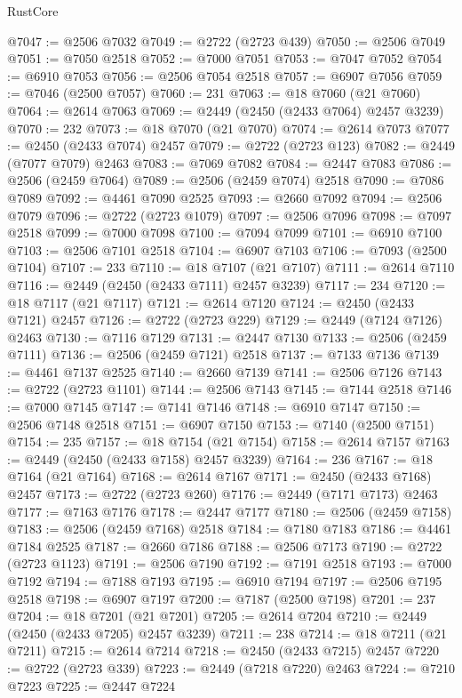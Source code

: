 \begin{lexlean}{RustCore}
\begin{coremodule}
@7047 := @2506 @7032
@7049 := @2722 (@2723 @439)
@7050 := @2506 @7049
@7051 := @7050 @2518
@7052 := @7000 @7051
@7053 := @7047 @7052
@7054 := @6910 @7053
@7056 := @2506 @7054 @2518
@7057 := @6907 @7056
@7059 := @7046 (@2500 @7057)
@7060 := 231
@7063 := @18 @7060 (@21 @7060)
@7064 := @2614 @7063
@7069 := @2449 (@2450 (@2433 @7064) @2457 @3239)
@7070 := 232
@7073 := @18 @7070 (@21 @7070)
@7074 := @2614 @7073
@7077 := @2450 (@2433 @7074) @2457
@7079 := @2722 (@2723 @123)
@7082 := @2449 (@7077 @7079) @2463
@7083 := @7069 @7082
@7084 := @2447 @7083
@7086 := @2506 (@2459 @7064)
@7089 := @2506 (@2459 @7074) @2518
@7090 := @7086 @7089
@7092 := @4461 @7090 @2525
@7093 := @2660 @7092
@7094 := @2506 @7079
@7096 := @2722 (@2723 @1079)
@7097 := @2506 @7096
@7098 := @7097 @2518
@7099 := @7000 @7098
@7100 := @7094 @7099
@7101 := @6910 @7100
@7103 := @2506 @7101 @2518
@7104 := @6907 @7103
@7106 := @7093 (@2500 @7104)
@7107 := 233
@7110 := @18 @7107 (@21 @7107)
@7111 := @2614 @7110
@7116 := @2449 (@2450 (@2433 @7111) @2457 @3239)
@7117 := 234
@7120 := @18 @7117 (@21 @7117)
@7121 := @2614 @7120
@7124 := @2450 (@2433 @7121) @2457
@7126 := @2722 (@2723 @229)
@7129 := @2449 (@7124 @7126) @2463
@7130 := @7116 @7129
@7131 := @2447 @7130
@7133 := @2506 (@2459 @7111)
@7136 := @2506 (@2459 @7121) @2518
@7137 := @7133 @7136
@7139 := @4461 @7137 @2525
@7140 := @2660 @7139
@7141 := @2506 @7126
@7143 := @2722 (@2723 @1101)
@7144 := @2506 @7143
@7145 := @7144 @2518
@7146 := @7000 @7145
@7147 := @7141 @7146
@7148 := @6910 @7147
@7150 := @2506 @7148 @2518
@7151 := @6907 @7150
@7153 := @7140 (@2500 @7151)
@7154 := 235
@7157 := @18 @7154 (@21 @7154)
@7158 := @2614 @7157
@7163 := @2449 (@2450 (@2433 @7158) @2457 @3239)
@7164 := 236
@7167 := @18 @7164 (@21 @7164)
@7168 := @2614 @7167
@7171 := @2450 (@2433 @7168) @2457
@7173 := @2722 (@2723 @260)
@7176 := @2449 (@7171 @7173) @2463
@7177 := @7163 @7176
@7178 := @2447 @7177
@7180 := @2506 (@2459 @7158)
@7183 := @2506 (@2459 @7168) @2518
@7184 := @7180 @7183
@7186 := @4461 @7184 @2525
@7187 := @2660 @7186
@7188 := @2506 @7173
@7190 := @2722 (@2723 @1123)
@7191 := @2506 @7190
@7192 := @7191 @2518
@7193 := @7000 @7192
@7194 := @7188 @7193
@7195 := @6910 @7194
@7197 := @2506 @7195 @2518
@7198 := @6907 @7197
@7200 := @7187 (@2500 @7198)
@7201 := 237
@7204 := @18 @7201 (@21 @7201)
@7205 := @2614 @7204
@7210 := @2449 (@2450 (@2433 @7205) @2457 @3239)
@7211 := 238
@7214 := @18 @7211 (@21 @7211)
@7215 := @2614 @7214
@7218 := @2450 (@2433 @7215) @2457
@7220 := @2722 (@2723 @339)
@7223 := @2449 (@7218 @7220) @2463
@7224 := @7210 @7223
@7225 := @2447 @7224

\end{coremodule}
\end{lexlean}
